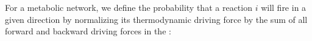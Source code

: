 For a metabolic network, we define the probability that a reaction $i$ will fire in a given direction by normalizing its thermodynamic driving force by the sum of all forward and backward driving forces in the :